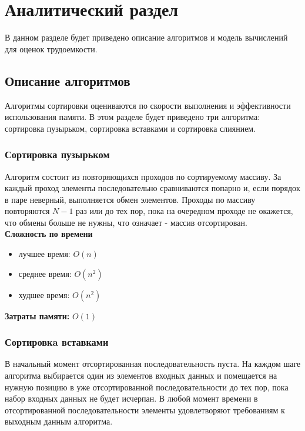 \chapter{Аналитический раздел}
\label{cha:analysis}

В данном разделе будет приведено описание алгоритмов и модель
вычислений для оценок трудоемкости.

\section{Описание алгоритмов}

Алгоритмы сортировки оцениваются по скорости выполнения и эффективности использования памяти.
В этом разделе будет приведено три алгоритма:
сортировка пузырьком, сортировка вставками и сортировка слиянием.

\subsection{Сортировка пузырьком}

Алгоритм состоит из повторяющихся проходов по сортируемому массиву.
За каждый проход элементы последовательно сравниваются попарно и,
если порядок в паре неверный, выполняется обмен элементов.
Проходы по массиву повторяются $N-1$ раз или до тех пор, пока на очередном
проходе не окажется, что обмены больше не нужны, что означает - массив отсортирован.
\\

\textbf{Сложность по времени}

\begin{itemize}
    \item лучшее время: $O(n)$
    \item среднее время: $O(n^2)$
    \item худшее время: $O(n^2)$
\end{itemize}

\textbf{Затраты памяти:} $O(1)$


\subsection{Сортировкa вставками}

В начальный момент отсортированная последовательность пуста.
На каждом шаге алгоритма выбирается один из элементов входных данных и помещается на
нужную позицию в уже отсортированной последовательности до тех пор,
пока набор входных данных не будет исчерпан.
В любой момент времени в отсортированной последовательности элементы удовлетворяют
требованиям к выходным данным алгоритма.
\\

